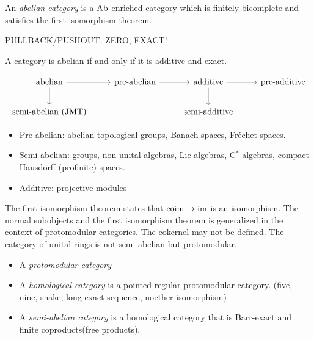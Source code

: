 \documentclass{../../large}
\begin{document}
\begin{prb}
An \emph{abelian category} is a $\mathrm{Ab}$-enriched category which is finitely bicomplete and satisfies the first isomorphism theorem.

PULLBACK/PUSHOUT, ZERO, EXACT!
\begin{parts}
\item A category is abelian if and only if it is additive and exact.
\end{parts}
\end{prb}


\begin{prb}
\end{prb}


\[\begin{tikzcd}[math mode=false]
abelian\ar{r}\ar{d} & pre-abelian \ar{r} & additive \ar{r}\ar{d} & pre-additive\\
semi-abelian (JMT) && semi-additive & \,
\end{tikzcd}\]
\begin{itemize}
\item Pre-abelian: abelian topological groups, Banach spaces, Fr\'echet spaces.
\item Semi-abelian: groups, non-unital algebras, Lie algebras, C$^*$-algebras, compact Hausdorff (profinite) spaces.
\item Additive: projective modules
\end{itemize}





The first isomorphism theorem states that $\operatorname{coim}\to\operatorname{im}$ is an isomorphism.
The normal subobjects and the first isomorphism theorem is generalized in the context of protomodular categories.
The cokernel may not be defined.
The category of unital rings is not semi-abelian but protomodular.
\begin{itemize}
\item A \emph{protomodular category}
\item A \emph{homological category} is a pointed regular protomodular category. (five, nine, snake, long exact sequence, noether isomorphism)
\item A \emph{semi-abelian category} is a homological category that is Barr-exact and finite coproducts(free products).
\end{itemize}




\section{}
\end{document}

